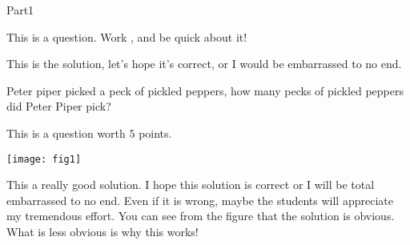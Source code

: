 \documentclass{article}
\begin{document}
\begin{exam}[Part I.]{Part1}
\begin{problem}[3]
This is a question.  Work \OnBackOfPage, and be quick about it!
\begin{solution}[1in]
This is the solution, let's hope it's correct, or I would be
embarrassed to no end.
\end{solution}
%
%
\begin{workarea}[.5\linewidth]{1in}
Peter piper picked a peck of pickled peppers, how many pecks of pickled
peppers did Peter Piper pick?
%
\vfill\hfill\setlength{\fboxsep}{6pt}
\end{workarea}
\end{problem}

%

\begin{problem}[5]
This is a question worth $5$ points.


\begin{splitsolution}{\panelheight}
\begin{panel}{\panelwidth}
\texttt{[image: fig1]}
\end{panel}
\begin{solution}
This a really good  solution. I hope this solution is correct or I will be total
embarrassed to no end. Even if it is wrong, maybe the students will appreciate
my tremendous effort. You can see from the figure that the solution is obvious.
What is less obvious is why this works!
\end{solution}
\end{splitsolution}
\end{problem}



\end{exam}
\end{document}

